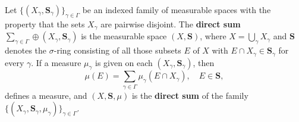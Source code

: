 Let $\{(X_\gamma, \mathbf{S}_\gamma)\}_{\gamma \in \Gamma}$ be an indexed family of measurable spaces with the property that the sets $X_\gamma$ are pairwise disjoint. The \textbf{direct sum} $\sum_{\gamma \in \Gamma} \oplus (X_\gamma, \mathbf{S}_\gamma)$ is the measurable space $(X, \mathbf{S})$, where $X = \bigcup_\gamma X_\gamma$ and $\mathbf{S}$ denotes the $\sigma$-ring consisting of all those subsets $E$ of $X$ with $E \cap X_\gamma \in \mathbf{S}_\gamma$ for every $\gamma$. If a measure $\mu_\gamma$ is given on each $(X_\gamma, \mathbf{S}_\gamma)$, then
$$\mu(E) = \sum_{\gamma \in \Gamma} \mu_\gamma(E \cap X_\gamma), \quad E \in \mathbf{S},$$
defines a measure, and $(X, \mathbf{S}, \mu)$ is the \textbf{direct sum} of the family $\{(X_\gamma, \mathbf{S}_\gamma, \mu_\gamma)\}_{\gamma \in \Gamma}$.
